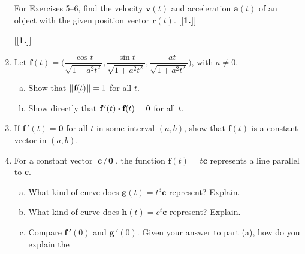 \begin{enumerate}[\bfseries 1.]
\par\noindent For Exercises 5--6, find the velocity $\textbf{v}(t)$ and acceleration $\textbf{a}(t)$ of an object
with the given position vector $\textbf{r}(t)$.
[{[\bfseries 1.]}]
[{[\bfseries 1.]}]
 \item Let $\textbf{f}(t) = \biggl( \dfrac{\cos t}{\sqrt{1 + a^2 t^2}},\dfrac{\sin t}{\sqrt{1 + a^2 t^2}},
  \dfrac{-at}{\sqrt{1 + a^2 t^2}} \biggr)$, with $a \ne 0$.
  \begin{enumerate}[(a)]
   \item Show that $\lVert\mspace{1mu}\textbf{f}(t)\mspace{1mu}\rVert = 1$ for all $t$.
   \item Show directly that $\textbf{f}\,'(t) \bm{\cdot} \textbf{f}(t) = 0$ for all $t$.
  \end{enumerate}
 \item If $\textbf{f}\,'(t) = \textbf{0}$ for all $t$ in some interval $(a,b)$, show that $\textbf{f}(t)$ is
  a constant vector in $(a,b)$.
 \item For a constant vector $\textbf{c} \ne \textbf{0}$, the function $\textbf{f}(t) = t\textbf{c}$ represents a line
  parallel to $\textbf{c}$.
  \begin{enumerate}[(a)]
   \item What kind of curve does $\textbf{g}(t) = t^3\textbf{c}$ represent? Explain.
   \item What kind of curve does $\textbf{h}(t) = e^t\textbf{c}$ represent? Explain.
   \item Compare $\textbf{f}\,'(0)$ and $\textbf{g}\,'(0)$. Given your answer to part (a), how do you explain the

\end{enumerate}
\end{enumerate}

